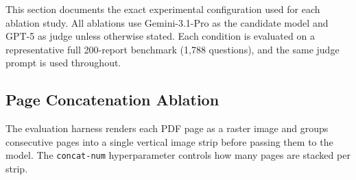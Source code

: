 \documentclass{article} %
\begin{document}
This section documents the exact experimental configuration used for each
ablation study.
All ablations use Gemini-3.1-Pro as the candidate model and GPT-5 as judge
unless otherwise stated. Each condition is evaluated on a representative
full 200-report benchmark (1,788 questions), and the same judge prompt is used throughout.

\subsection{Page Concatenation Ablation}
\label{app:abl_concat}

The evaluation harness renders each PDF page as a raster image and groups
consecutive pages into a single vertical image strip before passing them to
the model. The \texttt{concat-num} hyperparameter controls how many pages
are stacked per strip.

\begin{table}[htbp]
\centering
\begin{minipage}[t]{0.48\textwidth}
\centering
{}
\caption{Concat-num ablation configuration.}
\label{tab:ablation_concat}
\end{minipage}
\hfill
\begin{minipage}[t]{0.48\textwidth}
\centering
{}
\caption{DPI ablation configuration.}
\label{tab:ablation_dpi}
\end{minipage}
\end{table}
\end{document}

